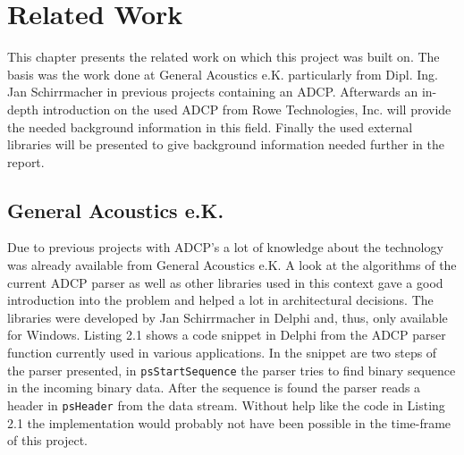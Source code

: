 \chapter{Related Work}
This chapter presents the related work on which this project was built on. The basis was the work done at General Acoustics e.K. particularly from Dipl. Ing. Jan Schirrmacher in previous projects containing an ADCP. Afterwards an in-depth introduction on the used ADCP from Rowe Technologies, Inc. will provide the needed background information in this field. Finally the used external libraries will be presented to give background information needed further in the report.

\section{General Acoustics e.K.}
Due to previous projects with ADCP's a lot of knowledge about the technology was already available from General Acoustics e.K. A look at the algorithms of the current ADCP parser as well as other libraries used in this context gave a good introduction into the problem and helped a lot in architectural decisions. The libraries were developed by Jan Schirrmacher in Delphi and, thus, only available for Windows. Listing 2.1 shows a code snippet in Delphi from the ADCP parser function currently used in various applications. In the snippet are two steps of the parser presented, in \texttt{psStartSequence} the parser tries to find binary sequence in the incoming binary data. After the sequence is found the parser reads a header in \texttt{psHeader} from the data stream. Without help like the code in Listing 2.1 the implementation would probably not have been possible in the time-frame of this project.
